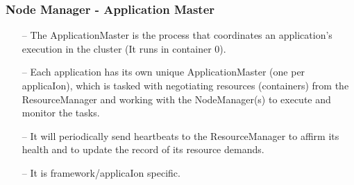 \begin{frame}[c]{ }
	\frametitle{Node Manager - Application Master }
	
	{\footnotesize
		\begin{itemize}  [<+->]
			\item [--] The ApplicationMaster is the process that coordinates an application’s execution in the cluster (It runs in container 0).

			\item [--] Each application has its own unique ApplicationMaster (one per applicaIon), which is tasked with negotiating resources (containers) from the ResourceManager and working with the NodeManager(s) to execute and monitor the tasks.

			\item [--] It will periodically send heartbeats to the ResourceManager to affirm its health and to update the record of its resource demands.

			\item [--] It is framework/applicaIon specific.			

		\end{itemize}
	}
\end{frame}


